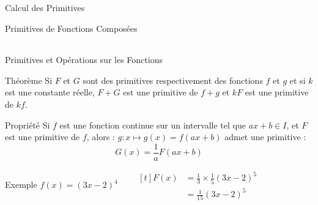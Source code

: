 \documentclass{cours}
\begin{document}
\begin{Gpartie}{Calcul des Primitives}
\begin{Spartie}{Primitives de Fonctions Composées}
\begin{table}[H]
\begin{tabular}[c]{ @{}*{3}{C}@{} }
                \end{tabular}
            \end{table}
        \end{Spartie}
        \pagebreak
        \begin{Spartie}{Primitives et Opérations sur les Fonctions} 
            \begin{SSpartie}{Théorème} 
                Si $F$ et $G$ sont des primitives respectivement des fonctions $f$ et $g$ et si $k$ est une constante réelle, $F+G$ est une primitive de $f+g$ et $kF$ est une primitive de $kf$.
            \end{SSpartie}
            \begin{SSpartie}{Propriété} 
                Si $f$ est une fonction continue sur un intervalle tel que $ax+b\in I$, et $F$ est une primitive de $f$, alors : $g:x\mapsto g(x)=f(ax+b)$ admet une primitive :
                \[G(x)=\frac{1}{a}F(ax+b)\]
                \begin{SSSpartie}{Exemple} 
                    $f(x)=(3x-2)^4\qquad
                    \begin{aligned}[t]
                        F(x)&=\tfrac{1}{3}\times\tfrac{1}{5}(3x-2)^5 \\
                        &=\tfrac{1}{15}(3x-2)^5
                    \end{aligned}$
                \end{SSSpartie}
            \end{SSpartie}
        \end{Spartie}
    \end{Gpartie}
\end{document}
